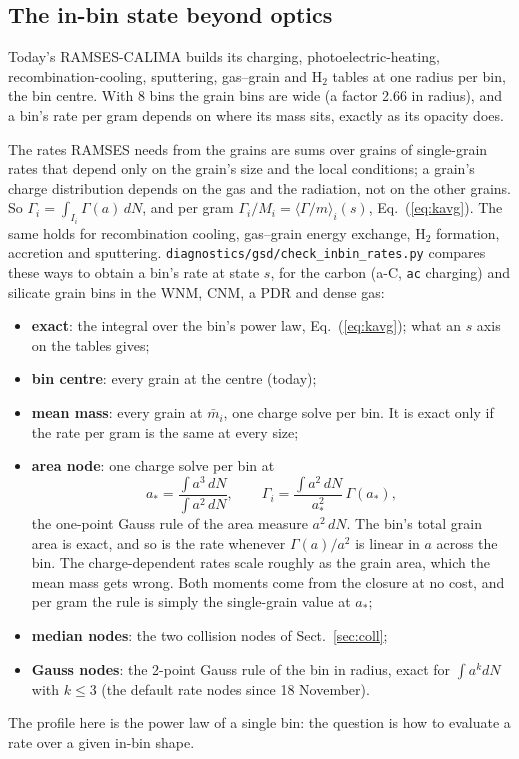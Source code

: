 \documentclass[11pt,a4paper]{article}
\begin{document}
\subsection{The in-bin state beyond optics}\label{sec:inbin}
Today's RAMSES-CALIMA builds its charging, photoelectric-heating, recombination-cooling, sputtering, gas--grain and
H$_2$ tables at one radius per bin, the bin centre. With 8 bins the grain bins are wide (a factor 2.66 in radius), and a
bin's rate per gram depends on where its mass sits, exactly as its opacity does.

The rates RAMSES needs from the grains are sums over grains of single-grain rates that depend only on the grain's size
and the local conditions; a grain's charge distribution depends on the gas and the radiation, not on the other grains.
So $\Gamma_i = \int_{I_i}\Gamma(a)\,dN$, and per gram $\Gamma_i/M_i = \langle\Gamma/m\rangle_i(s)$, Eq.~(\ref{eq:kavg}).
The same holds for recombination cooling, gas--grain energy exchange, H$_2$ formation, accretion and sputtering.
\texttt{diagnostics/gsd/check\_inbin\_rates.py} compares these ways to obtain a bin's rate at state $s$, for the
carbon (a-C, \texttt{ac} charging) and silicate grain bins in the WNM, CNM, a PDR and dense gas:
\begin{itemize}
\item \textbf{exact}: the integral over the bin's power law, Eq.~(\ref{eq:kavg}); what an $s$ axis on the tables gives;
\item \textbf{bin centre}: every grain at the centre (today);
\item \textbf{mean mass}: every grain at $\bar m_i$, one charge solve per bin. It is exact only if the rate per gram is
  the same at every size;
\item \textbf{area node}: one charge solve per bin at
  \begin{equation}
  a_* = \frac{\int a^3\,dN}{\int a^2\,dN}, \qquad \Gamma_i = \frac{\int a^2\,dN}{a_*^2}\,\Gamma(a_*),
  \label{eq:areanode}
  \end{equation}
  the one-point Gauss rule of the area measure $a^2\,dN$. The bin's total grain area is exact, and so is the rate
  whenever $\Gamma(a)/a^2$ is linear in $a$ across the bin. The charge-dependent rates scale roughly as the grain area,
  which the mean mass gets wrong. Both moments come from the closure at no cost, and per gram the rule is simply the
  single-grain value at $a_*$;
\item \textbf{median nodes}: the two collision nodes of Sect.~\ref{sec:coll};
\item \textbf{Gauss nodes}: the 2-point Gauss rule of the bin in radius, exact for $\int a^k dN$ with $k\le3$ (the
  default rate nodes since 18 November).
\end{itemize}
The profile here is the power law of a single bin: the question is how to evaluate a rate over a given in-bin shape.
\end{document}
